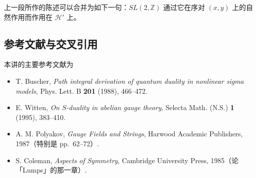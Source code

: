 上一段所作的陈述可以合并为如下一句：$SL(2,\mathbb{Z})$ 通过它在序对 $(x,y)$ 上的自然作用而作用在 $\mathcal{H}'$ 上。

\subsection*{参考文献与交叉引用}

本讲的主要参考文献为
\begin{itemize}
  \item T. Buscher, \emph{Path integral derivation of quantum duality in nonlinear sigma models}, Phys. Lett. B \textbf{201} (1988), 466--472.
  \item E. Witten, \emph{On $S$-duality in abelian gauge theory}, Selecta Math. (N.S.) \textbf{1} (1995), 383--410.
  \item A. M. Polyakov, \emph{Gauge Fields and Strings}, Harwood Academic Publishers, 1987（特别是 pp.~62--72）.
  \item S. Coleman, \emph{Aspects of Symmetry}, Cambridge University Press, 1985（论「Lumps」的那一章）.
\end{itemize}
